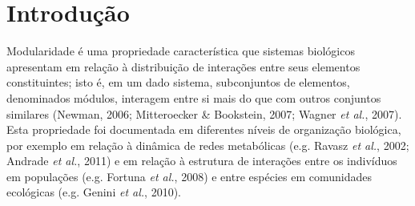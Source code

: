 \documentclass[12pt,twoside]{report}
\renewcommand{\headrulewidth}{0pt}%
\begin{document}




\newpage

\tableofcontents
{\footnotesize \listoffigures}
\listoftables
\newpage


\def\sectionautorefname{Seção}
\def\chapterautorefname{Capítulo}
\def\figureautorefname{Figura}
\def\tableautorefname{Tabela}

\onehalfspacing

\pagestyle{fancy}

\renewcommand{\chaptermark}[1]{\markboth{#1}{}}
\renewcommand{\sectionmark}[1]{\markright{#1}{}}

\fancyhf{} \fancyhead[RO]{\itshape \leftmark}
\fancyhead[LE]{\itshape \rightmark} \fancyfoot[RO,LE]{\thepage}
\renewcommand{\headrulewidth}{0.5pt} \renewcommand{\footrulewidth}{0pt}

\linenumbers
\modulolinenumbers[5]

\newpage
\chapter{Introdução}
\label{ch:intro}

Modularidade é uma propriedade característica que sistemas biológicos
apresentam em relação à distribuição de interações entre seus elementos
constituintes; isto é, em um dado sistema, subconjuntos de elementos,
denominados módulos, interagem entre si mais do que com outros conjuntos
similares (Newman, 2006; Mitteroecker \& Bookstein, 2007; Wagner
\emph{et al.}, 2007). Esta propriedade foi documentada em diferentes
níveis de organização biológica, por exemplo em relação à dinâmica de
redes metabólicas (e.g. Ravasz \emph{et al.}, 2002; Andrade \emph{et
al.}, 2011) e em relação à estrutura de interações entre os indivíduos
em populações (e.g. Fortuna \emph{et al.}, 2008) e entre espécies em
comunidades ecológicas (e.g. Genini \emph{et al.}, 2010).
\end{document}
